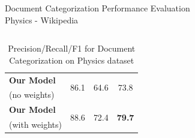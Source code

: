 \documentclass[10pt]{beamer}
\newcommand{\highest}[1]{\textbf{#1}}
\begin{document}
\begin{frame}{Document Categorization Performance Evaluation \\ Physics - Wikipedia }
\begin{columns}[T]
\begin{column}{.4\textwidth}
\begin{table}[h!]
\begin{center}
\begin{tabular}{l@{\hskip5mm} c c@{\hskip4mm} c}
		\textbf{Our Model}
		& \multirow{2}{*}{86.1}   & \multirow{2}{*}{64.6}  & \multirow{2}{*}{73.8} \\
		(no weights) & & & \\ \addlinespace[1mm]
		\textbf{Our Model}
		& \multirow{2}{*}{88.6}   & \multirow{2}{*}{72.4}  & \multirow{2}{*}{\highest{79.7}} \\
		(with weights) & & & \\
		\bottomrule         
		\end{tabular}
		\caption*{\footnotesize Precision/Recall/F1 for Document Categorization on Physics dataset}
		\end{center}
		\end{table}
	\end{column}
\end{columns}

\end{frame}
\end{document}
